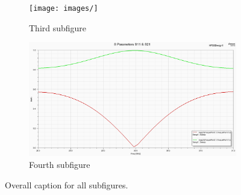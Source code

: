 \documentclass[12pt]{article}
\begin{document}
\begin{figure}[ht]
\begin{subfigure}[b]{0.45\textwidth}
  \centering
  \texttt{[image: images/]} 
  \caption{Third subfigure}
  \label{fig:sub3}
\end{subfigure}
\hfill %
\begin{subfigure}[b]{0.45\textwidth}
  \centering
  \includegraphics[width=\textwidth]{./images/Go1_5-9_final.png}
  \caption{Fourth subfigure}
  \label{fig:sub4}
\end{subfigure}

\caption{Overall caption for all subfigures.}
\label{fig:1}
\end{figure}


\end{document}
